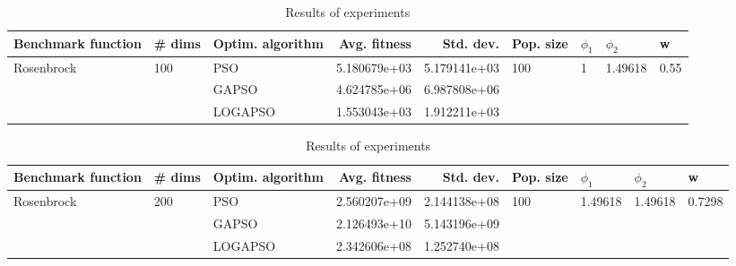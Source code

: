 \documentclass{article}
\begin{document}
\begin{table}
\centering
\caption{Results of experiments}
\begin{tabular}{lllrrllll}
\toprule
         Benchmark function &              \# dims & Optim. algorithm &  Avg. fitness &    Std. dev. &            Pop. size &         $\phi_{1}$ &               $\phi_{2}$ &                     w \\
\midrule
\multirow{3}{*}{Rosenbrock} & \multirow{3}{*}{100} &              PSO &  5.180679e+03 & 5.179141e+03 & \multirow{3}{*}{100} & \multirow{3}{*}{1} & \multirow{3}{*}{1.49618} & \multirow{3}{*}{0.55} \\
                            &                      &            GAPSO &  4.624785e+06 & 6.987808e+06 &                      &                    &                          &                       \\
                            &                      &          LOGAPSO &  1.553043e+03 & 1.912211e+03 &                      &                    &                          &                       \\
\bottomrule
\end{tabular}
\end{table}
\begin{table}
\centering
\caption{Results of experiments}
\begin{tabular}{lllrrllll}
\toprule
         Benchmark function &              \# dims & Optim. algorithm &  Avg. fitness &    Std. dev. &            Pop. size &               $\phi_{1}$ &               $\phi_{2}$ &                       w \\
\midrule
\multirow{3}{*}{Rosenbrock} & \multirow{3}{*}{200} &              PSO &  2.560207e+09 & 2.144138e+08 & \multirow{3}{*}{100} & \multirow{3}{*}{1.49618} & \multirow{3}{*}{1.49618} & \multirow{3}{*}{0.7298} \\
                            &                      &            GAPSO &  2.126493e+10 & 5.143196e+09 &                      &                          &                          &                         \\
                            &                      &          LOGAPSO &  2.342606e+08 & 1.252740e+08 &                      &                          &                          &                         \\
\bottomrule
\end{tabular}
\end{table}
\end{document}
